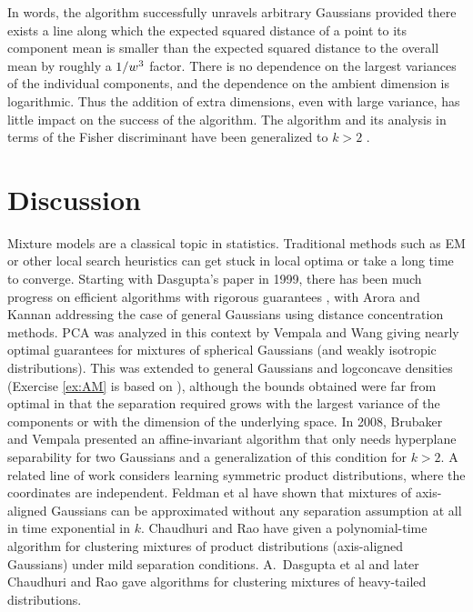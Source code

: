 \documentclass{book}
\numberwithin{exercise}{chapter}
\begin{document}
In words, the algorithm successfully unravels arbitrary Gaussians
provided there exists a line along which the expected squared distance of a point to its
component mean is smaller than the expected squared distance to the
overall mean by roughly a $1/w^3$ factor. There is no
dependence on the largest variances of the individual components, and
the dependence on the ambient dimension is logarithmic.  Thus
the addition of extra dimensions, even with large variance, has little impact
on the success of the algorithm. The algorithm and its analysis in terms of the Fisher discriminant have been generalized to $k >2$ \cite{Brubaker2008}.

\section{Discussion}
Mixture models are a classical topic in statistics. Traditional methods such as EM or other local search heuristics can get stuck in local optima or take a long time to converge. Starting with Dasgupta's paper \cite{Dasgupta1999} in 1999, there has been much progress on efficient algorithms with rigorous guarantees \cite{Arora2005,Dasgupta2000}, with Arora and Kannan \cite{Arora2005}  addressing the case of general Gaussians using distance concentration methods. PCA was analyzed in this context by Vempala and Wang \cite{Vempala2004} giving nearly optimal guarantees for mixtures of spherical Gaussians (and weakly isotropic distributions). This was extended to general Gaussians and logconcave densities \cite{Kannan2008,Achlioptas2005} (Exercise \ref{ex:AM} is based on \cite{Achlioptas2005}), although the bounds obtained were far from optimal in that the separation required grows with the largest variance of the components or with the dimension of the underlying space. In 2008, Brubaker and Vempala \cite{Brubaker2008} presented an affine-invariant algorithm that only needs hyperplane separability for two Gaussians and a generalization of this condition for $k > 2$.
A related line of work considers learning symmetric product
distributions, where the coordinates are independent.  Feldman et al
\cite{Feldman2006} have shown that mixtures of axis-aligned Gaussians
can be approximated without any separation assumption at all in time
exponential in $k$.  Chaudhuri and
Rao \cite{Chaudhuri2008a} have given a polynomial-time
algorithm for clustering mixtures of product distributions (axis-aligned Gaussians) under mild separation conditions. A.~Dasgupta et al \cite{Dasgupta2005} and later Chaudhuri and Rao \cite{Chaudhuri2008b} gave algorithms for clustering mixtures of
heavy-tailed distributions.
\end{document}
